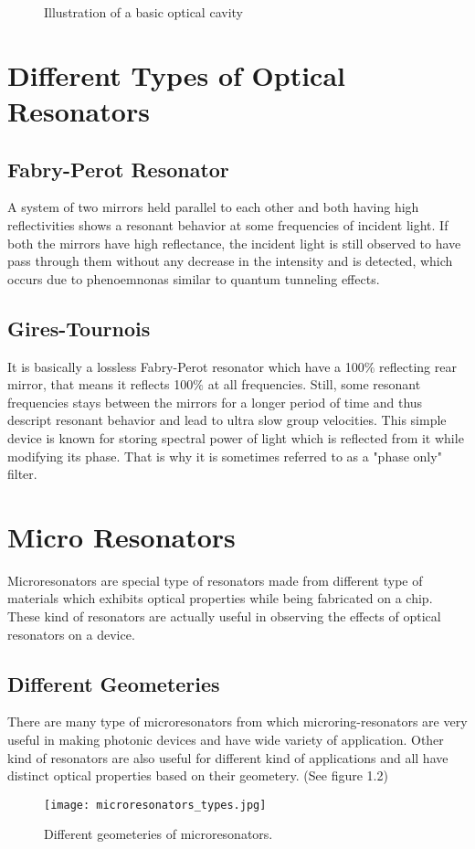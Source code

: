 \begin{figure}[h]
\centering
{}
\caption{Illustration of a basic optical cavity}
\end{figure}

\newpage
\section{Different Types of Optical Resonators}
\subsection{Fabry-Perot Resonator}
A system of two mirrors held parallel to each other and both having high reflectivities shows a resonant behavior at some frequencies of incident light. If both the mirrors have high reflectance, the incident light is still observed to have pass through them without any decrease in the intensity and is detected, which occurs due to phenoemnonas similar to quantum tunneling effects.

\subsection{Gires-Tournois}
It is basically a lossless Fabry-Perot resonator which have a 100$\%$ reflecting rear mirror, that means it reflects 100$\%$ at all frequencies. Still, some resonant frequencies stays between the mirrors for a longer period of time and thus descript resonant behavior and lead to ultra slow group velocities. This simple device is known for storing spectral power of light which is reflected from it while modifying its phase. That is why it is sometimes referred to as a "phase only" filter.


\section{Micro Resonators}
Microresonators are special type of resonators made from different type of materials which exhibits optical properties while being fabricated on a chip. These kind of resonators are actually useful in observing the effects of optical resonators on a device.
\subsection{Different Geometeries}
There are many type of microresonators from which microring-resonators are very useful in making photonic devices and have wide variety of application. Other kind of resonators are also useful for different kind of applications and all have distinct optical properties based on their geometery. (See figure 1.2)
\begin{figure}[h]
\centering
\texttt{[image: microresonators\_types.jpg]}
\caption{Different geometeries of microresonators.}
\end{figure}


